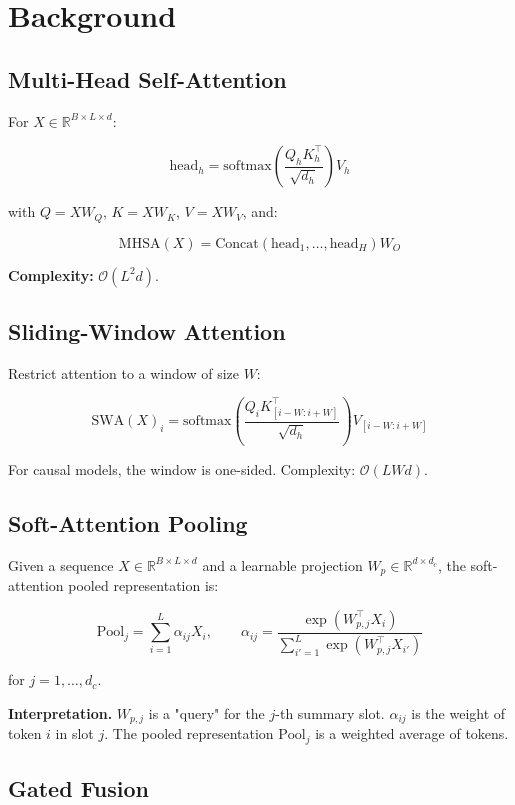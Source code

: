 
\section{Background}

\subsection{Multi-Head Self-Attention}

For $X \in \mathbb{R}^{B \times L \times d}$:

\[
\text{head}_h = \text{softmax}\!\left(\frac{Q_h K_h^\top}{\sqrt{d_h}}\right) V_h
\]

with $Q = X W_Q$, $K = X W_K$, $V = X W_V$, and:

\[
\text{MHSA}(X) = \text{Concat}(\text{head}_1, \dots, \text{head}_H) W_O
\]

\textbf{Complexity:} $\mathcal{O}(L^2 d)$.

\subsection{Sliding-Window Attention}

Restrict attention to a window of size $W$:

\[
\text{SWA}(X)_i = \text{softmax}\!\left(\frac{Q_i K_{[i-W:i+W]}^\top}{\sqrt{d_h}}\right) V_{[i-W:i+W]}
\]

For causal models, the window is one-sided. Complexity: $\mathcal{O}(L W d)$.

\subsection{Soft-Attention Pooling}

Given a sequence $X \in \mathbb{R}^{B \times L \times d}$ and a learnable 
projection $W_p \in \mathbb{R}^{d \times d_c}$, the soft-attention pooled 
representation is:

\[
\text{Pool}_j = \sum_{i=1}^{L} \alpha_{ij} X_i, \qquad
\alpha_{ij} = \frac{\exp(W_{p,j}^\top X_i)}{\sum_{i'=1}^L \exp(W_{p,j}^\top X_{i'})}
\]

for $j = 1, \dots, d_c$.

\textbf{Interpretation.} $W_{p,j}$ is a "query" for the $j$-th summary slot. 
$\alpha_{ij}$ is the weight of token $i$ in slot $j$. The pooled 
representation $\text{Pool}_j$ is a weighted average of tokens.

\subsection{Gated Fusion}

